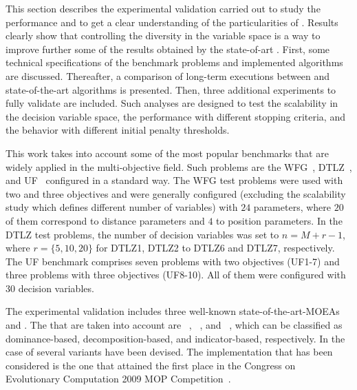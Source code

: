 This section describes the experimental validation carried out to study the performance and
to get a clear understanding of the particularities of \VSDMOEA{}.
%
Results clearly show that controlling the diversity in the variable space is a way to improve further some of the results 
obtained by the state-of-art \MOEAS{}.
%
First, some technical specifications of the benchmark problems and implemented algorithms are discussed.
%
Thereafter, a comparison of long-term executions between \VSDMOEA{} and state-of-the-art algorithms is presented.
%
Then, three additional experiments to fully validate \VSDMOEA{} are included.
%
Such analyses are designed to test the scalability in the decision variable space, the performance with different stopping criteria, 
and the behavior with different initial penalty thresholds.

This work takes into account some of the most popular benchmarks that are widely applied in the multi-objective field.
%
Such problems are the WFG~\cite{Joel:WFG}, DTLZ~\cite{Joel:DTLZ}, and UF~\cite{Joel:CEC2009} configured in a 
standard way.
%
The WFG test problems were used with two and three objectives and 
were generally configured (excluding the scalability study which defines different number of variables) with $24$ parameters, where $20$ of them correspond to distance parameters and $4$ to position parameters.
%
In the DTLZ test problems, the number of decision variables was set to $n=M+r-1$, where $r=\{5, 10, 20\}$ for DTLZ1, DTLZ2 to DTLZ6 and DTLZ7, respectively.
% 
The UF benchmark comprises seven problems with two objectives (UF1-7) and three problems with three objectives (UF8-10).
%
All of them were configured with $30$ decision variables.

The experimental validation includes three well-known state-of-the-art-MOEAs and \VSDMOEA{}.
%
The \MOEAS{} that are taken into account are \NSGAII{}~\cite{Joel:jMetal}, \MOEAD{}~\cite{MOEADCode}, and \RMOEA{}~\cite{R2EMOACode}, 
which can be classified as dominance-based, decomposition-based, and indicator-based, respectively.
%
In the case of \MOEAD{} several variants have been devised.
%
The \MOEAD{} implementation that has been considered is the one that attained the first place in the Congress on Evolutionary Computation 
2009 MOP Competition~\cite{zhang2009performance}.

